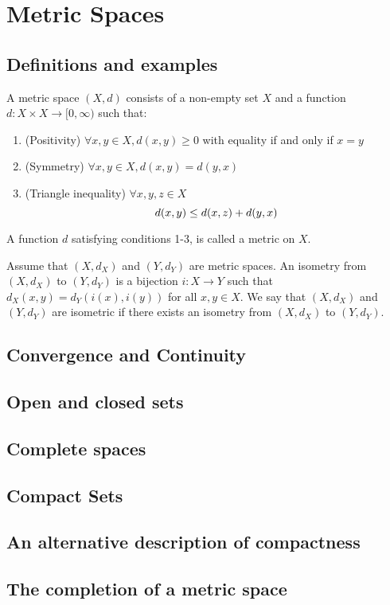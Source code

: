 \chapter{Metric Spaces}

\section{Definitions and examples}

\begin{definition}
  A metric space $\left( X, d \right)$ consists of a non-empty set $X$ and a
  function $d: X\times X \rightarrow [0, \infty )$ such that:
  \begin{enumerate}
    \item (Positivity) $\forall x, y \in X, d(x, y) \geq 0$ with equality if and only if $x=y$
    \item (Symmetry) $\forall x, y \in X, d(x, y) = d(y, x)$
    \item (Triangle inequality) $\forall x, y, z \in X$
      \begin{equation}
        \notag
        d(x, y) \leq d(x, z) + d(y, x)
      \end{equation}
  \end{enumerate}
  A function $d$ satisfying conditions 1-3, is called a metric on $X$. 
\end{definition}

\begin{definition}
  Assume that $\left( X, d_X \right)$ and $\left( Y, d_Y \right)$ are metric
  spaces. An isometry from $\left( X, d_X \right)$ to $\left( Y, d_Y \right)$
  is a bijection $i : X \rightarrow Y$ such that $d_X\left( x, y \right) =
  d_Y\left( i(x), i(y) \right)$ for all $x, y \in X$.  We say that $\left( X,
  d_X \right)$ and $\left(Y, d_Y \right)$ are isometric if there exists an
  isometry from $(X, d_X)$ to $\left( Y, d_Y \right)$.
\end{definition}


\section{Convergence and Continuity}
\section{Open and closed sets}
\section{Complete spaces}
\section{Compact Sets}
\section{An alternative description of compactness}
\section{The completion of a metric space}



